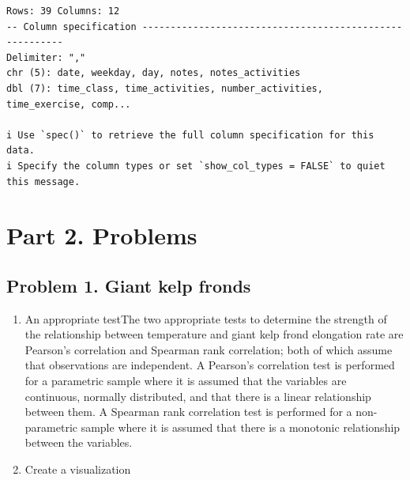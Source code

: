 \documentclass[
  letterpaper,
  DIV=11,
  numbers=noendperiod]{scrartcl}
\begin{document}
\begin{verbatim}
Rows: 39 Columns: 12
-- Column specification --------------------------------------------------------
Delimiter: ","
chr (5): date, weekday, day, notes, notes_activities
dbl (7): time_class, time_activities, number_activities, time_exercise, comp...

i Use `spec()` to retrieve the full column specification for this data.
i Specify the column types or set `show_col_types = FALSE` to quiet this message.
\end{verbatim}

\section{Part 2. Problems}\label{part-2.-problems}

\subsection{Problem 1. Giant kelp
fronds}\label{problem-1.-giant-kelp-fronds}

\begin{enumerate}
\def\labelenumi{\alph{enumi}.}
\item
  An appropriate test\newline The two appropriate tests to determine the
  strength of the relationship between temperature and giant kelp frond
  elongation rate are Pearson's correlation and Spearman rank
  correlation; both of which assume that observations are independent. A
  Pearson's correlation test is performed for a parametric sample where
  it is assumed that the variables are continuous, normally distributed,
  and that there is a linear relationship between them. A Spearman rank
  correlation test is performed for a non-parametric sample where it is
  assumed that there is a monotonic relationship between the variables.
\item
  Create a visualization\newline
\end{enumerate}
\end{document}
